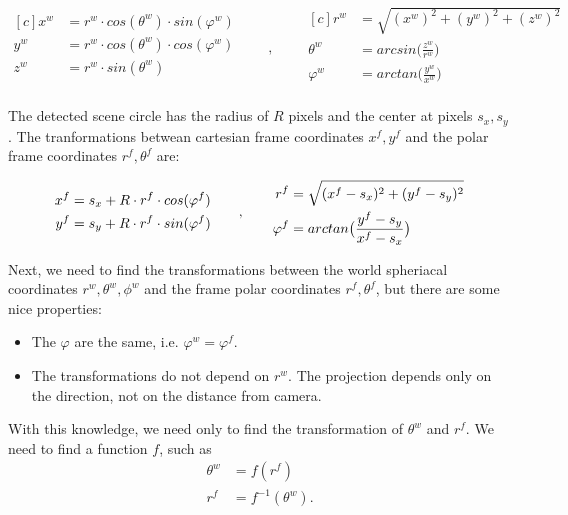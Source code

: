 \documentclass[a4paper,12pt,titlepage, twoside]{article}
\numberwithin{figure}{section}
\begin{document}
\begin{equation*}
\begin{aligned}[c]
x^w &= r^w \cdot cos(\theta^w) \cdot sin(\varphi^w) \\
y^w &= r^w \cdot cos(\theta^w) \cdot cos(\varphi^w) \\
z^w &= r^w \cdot sin(\theta^w) \\
\end{aligned}
\qquad,\qquad
\begin{aligned}[c]
r^w &= \sqrt{(x^w)^2 + (y^w)^2 + (z^w)^2} \\
\theta^w &= arcsin\Big(\frac{z^w}{r^w}\Big) \\
\varphi^w &= arctan\Big(\frac{y^w}{x^w}\Big) \\
\end{aligned}
\end{equation*}



The detected scene circle has the radius of $R$ pixels and the center at pixels $s_x, s_y$. The tranformations betwean cartesian frame coordinates $x^f, y^f$ and the polar frame coordinates $r^f, \theta^f$ are:

\begin{equation*}
\begin{aligned}[c]
x^f &= s_x + R \cdot r^f \cdot cos(\varphi^f) \\
y^f &= s_y + R \cdot r^f \cdot sin(\varphi^f) \\
\end{aligned}
\qquad,\qquad
\begin{aligned}[c]
r^f &= \sqrt{(x^f - s_x)^2 + (y^f - s_y)^2} \\
\varphi^f &= arctan\big{(}\frac{y^f - s_y}{x^f - s_x}\big{)}
\end{aligned}
\end{equation*}

Next, we need to find the transformations between the world spheriacal coordinates $r^w, \theta^w, \phi^w$ and the frame polar coordinates $r^f, \theta^f$, but there are some nice properties:

\begin{itemize}
\item The $\varphi$ are the same, i.e. $\varphi^w = \varphi^f$.
\item The transformations do not depend on $r^w$. The projection depends only on the direction, not on the distance from camera.
\end{itemize}

With this knowledge, we need only to find the transformation of $\theta^w$ and $r^f$. We need to find a function $f$, such as 
\begin{equation}
\begin{aligned}
\theta^w &= f(r^f) \\
r^f &= f^{-1}(\theta^w). \\
\end{aligned}
\end{equation}
\end{document}
